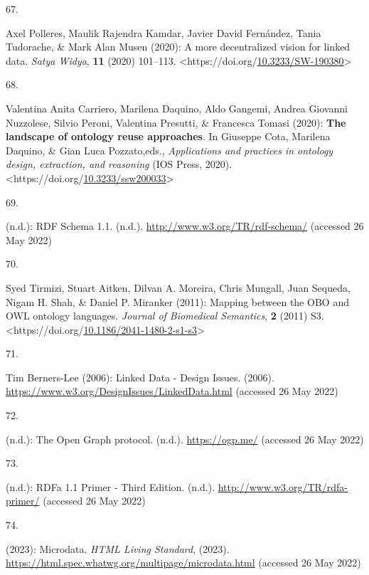 \begin{thebibliography}{9}
\hypertarget{ref-polleresMoreDecentralizedVision2020a}{}
67.

Axel Polleres, Maulik Rajendra Kamdar, Javier David Fernández, Tania
Tudorache, \& Mark Alan Musen (2020): A more decentralized vision for
linked data. \emph{Satya Widya}, \textbf{11} (2020) 101--113.
\textless https://doi.org/\href{https://doi.org/10.3233/SW-190380}{10.3233/SW-190380}\textgreater{}

\hypertarget{ref-carrieroLandscapeOntologyReuse2020a}{}
68.

Valentina Anita Carriero, Marilena Daquino, Aldo Gangemi, Andrea
Giovanni Nuzzolese, Silvio Peroni, Valentina Presutti, \& Francesca
Tomasi (2020): \textbf{The landscape of ontology reuse approaches}. In
Giuseppe Cota, Marilena Daquino, \& Gian Luca Pozzato,eds.,
\emph{Applications and practices in ontology design, extraction, and
reasoning} ({IOS Press}, 2020).
\textless https://doi.org/\href{https://doi.org/10.3233/ssw200033}{10.3233/ssw200033}\textgreater{}

\hypertarget{ref-w3-rdf-schema}{}
69.

(n.d.): {RDF Schema} 1.1. (n.d.). \url{http://www.w3.org/TR/rdf-schema/}
(accessed 26 May 2022)

\hypertarget{ref-tirmiziMappingOBOOWL2011a}{}
70.

Syed Tirmizi, Stuart Aitken, Dilvan A. Moreira, Chris Mungall, Juan
Sequeda, Nigam H. Shah, \& Daniel P. Miranker (2011): Mapping between
the {OBO} and {OWL} ontology languages. \emph{Journal of Biomedical
Semantics}, \textbf{2} (2011) S3.
\textless https://doi.org/\href{https://doi.org/10.1186/2041-1480-2-s1-s3}{10.1186/2041-1480-2-s1-s3}\textgreater{}

\hypertarget{ref-LinkedDataDesign}{}
71.

Tim Berners-Lee (2006): Linked {Data} - {Design Issues}. (2006).
\url{https://www.w3.org/DesignIssues/LinkedData.html} (accessed 26 May
2022)

\hypertarget{ref-OpenGraphProtocol}{}
72.

(n.d.): The {Open Graph} protocol. (n.d.). \url{https://ogp.me/}
(accessed 26 May 2022)

\hypertarget{ref-w3-rdfa-primer}{}
73.

(n.d.): {RDFa} 1.1 {Primer} - {Third Edition}. (n.d.).
\url{http://www.w3.org/TR/rdfa-primer/} (accessed 26 May 2022)

\hypertarget{ref-HTMLStandard}{}
74.

(2023): {Microdata}. \emph{{HTML Living Standard}}, (2023).
\url{https://html.spec.whatwg.org/multipage/microdata.html} (accessed 26
May 2022)


\end{thebibliography}
